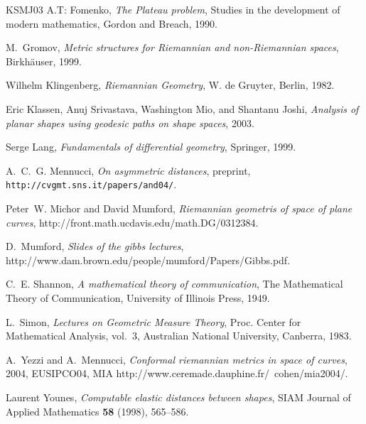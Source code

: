 \documentclass[twoside,a4paper,english]{article}
\begin{document}
\begin{thebibliography}{KSMJ03}
A.T: Fomenko, \emph{The {P}lateau problem}, Studies in the development of
  modern mathematics, Gordon and Breach, 1990.

M.~Gromov, \emph{Metric structures for {R}iemannian and non-{R}iemannian
  spaces}, Birkh\"auser, 1999.

Wilhelm Klingenberg, \emph{{R}iemannian {G}eometry}, W. de Gruyter, Berlin,
  1982.

Eric Klassen, Anuj Srivastava, Washington Mio, and Shantanu Joshi,
  \emph{Analysis of planar shapes using geodesic paths on shape spaces}, 2003.

Serge Lang, \emph{Fundamentals of differential geometry}, Springer, 1999.

A.~C.~G. Mennucci, \emph{On asymmetric distances}, preprint,
  \verb+http://cvgmt.sns.it/papers/and04/+.

Peter~W. Michor and David Mumford, \emph{{R}iemannian geometris of space of
  plane curves}, http://front.math.ucdavis.edu/math.DG/0312384.

D.~Mumford, \emph{Slides of the gibbs lectures},
  http://www.dam.brown.edu/people/mumford/Papers/Gibbs.pdf.

C.~E. Shannon, \emph{A mathematical theory of communication}, The Mathematical
  Theory of Communication, University of Illinois Press, 1949.

L.~Simon, \emph{Lectures on {G}eometric {M}easure {T}heory}, Proc. Center for
  Mathematical Analysis, vol.~3, Australian National University, Canberra,
  1983.

A.~Yezzi and A.~Mennucci, \emph{Conformal riemannian metrics in space of
  curves}, 2004, EUSIPCO04, MIA
  http://www.ceremade.dauphine.fr/~cohen/mia2004/.

Laurent Younes, \emph{Computable elastic distances between shapes}, SIAM
  Journal of Applied Mathematics \textbf{58} (1998), 565--586.

\end{thebibliography}
\end{document}

